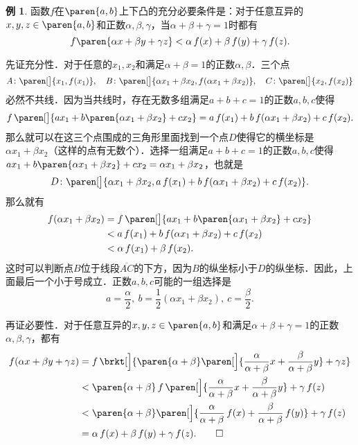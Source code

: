 \documentclass[a4paper,punct=CCT]{ctexbook}
\makeatletter
\theoremstyle{definition}
\newtheorem*{example*}{例}
\theoremstyle{remark}
\renewcommand*{\proofname}{证}
\renewenvironment{proof}[1][\proofname]{\par
  \pushQED{\qed}%
  \normalfont \topsep6\p@\@plus6\p@\relax
  \trivlist
  \item[\hskip\labelsep
    \bfseries
    #1%
    ]\ignorespaces
}{%
  \popQED\endtrivlist\@endpefalse
}
\makeatother
\begin{document}
\begin{example*}
  函数\(f\)在\(\paren{a,b}\)上下凸的充分必要条件是：对于任意互异的\(x, y, z \in \paren{a,b}\)和正数\(\alpha, \beta, \gamma\)，当\(\alpha+\beta+\gamma=1\)时都有
  \[
    f\paren{\alpha x + \beta y + \gamma z} < \alpha\,f(x) + \beta\,f(y) + \gamma\,f(z).
  \]

  \begin{proof}
    先证充分性．对于任意的\(x_1, x_2\)和满足\(\alpha+\beta=1\)的正数\(\alpha, \beta\)．三个点
    \[
      A\colon \paren[\big]{x_1, f(x_1)},\quad B\colon \paren[\big]{\alpha x_1 + \beta x_2, f(\alpha x_1 + \beta x_2)},\quad C\colon \paren[\big]{x_2, f(x_2)}
    \]
    必然不共线．因为当共线时，存在无数多组满足\(a+b+c=1\)的正数\(a, b, c\)使得
    \[
      f\,\paren[\big]{a x_1 + b\paren{\alpha x_1 + \beta x_2}  + c x_2} = a\,f(x_1) + b\,f(\alpha x_1 + \beta x_2) + c\,f(x_2).
    \]
    那么就可以在这三个点围成的三角形里面找到一个点\(D\)使得它的横坐标是\(\alpha x_1 + \beta x_2\)（这样的点有无数个）．选择一组满足\(a+b+c=1\)的正数\(a, b, c\)使得\(a x_1 + b\paren{\alpha x_1 + \beta x_2}  + c x_2 = \alpha x_1 + \beta x_2 \)，也就是
    \[
      D\colon \paren[\big]{\alpha x_1 + \beta x_2, a\,f(x_1) + b\,f(\alpha x_1 + \beta x_2) + c\,f(x_2)}.
    \]
    那么就有
    \[
      \begin{split}
        f(\alpha x_1 + \beta x_2)
        &= f\,\paren[\big]{a x_1 + b\paren{\alpha x_1 + \beta x_2}  + c x_2} \\
        &< a\,f(x_1) + b\,f(\alpha x_1 + \beta x_2) + c\,f(x_2) \\
        &< \alpha\,f(x_1) + \beta\,f(x_2).
      \end{split}
    \]
    这时可以判断点\(B\)位于线段\(\overline{AC}\)的下方，因为\(B\)的纵坐标小于\(D\)的纵坐标．因此，上面最后一个小于号成立．正数\(a, b, c\)可能的一组选择是
    \[
      a = \frac\alpha2,\ b = \frac12(\alpha x_1 + \beta x_2),\ c = \frac\beta2.
    \]

    再证必要性．对于任意互异的\(x, y, z \in \paren{a,b}\)和满足\(\alpha+\beta+\gamma=1\)的正数\(\alpha, \beta, \gamma\)，都有
    \[
      \begin{split}
        f(\alpha x + \beta y + \gamma z)
        &= f\,\brkt[\Big]{\paren{\alpha+\beta}\paren[\Big]{\frac{\alpha}{\alpha+\beta} x + \frac{\beta}{\alpha+\beta} y} + \gamma z} \\
        &< \paren{\alpha+\beta}\,f\,\paren[\Big]{\frac{\alpha}{\alpha+\beta} x + \frac{\beta}{\alpha+\beta} y} + \gamma\,f(z) \\
        &< \paren{\alpha+\beta}\paren[\Big]{\frac{\alpha}{\alpha+\beta}\,f(x) + \frac{\beta}{\alpha+\beta}\,f(y)} + \gamma\,f(z) \\
        &= \alpha\,f(x) + \beta\,f(y) + \gamma\,f(z). \qedhere
      \end{split}
    \]


\end{proof}
\end{example*}
\end{document}
